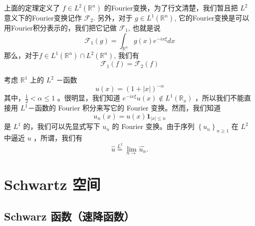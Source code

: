 \begin{remark}
上面的定理定义了 $f \in L^2(\mathbb{R}^n)$ 的Fourier变换，为了行文清楚，我们暂且把 $L^2$ 意义下的Fourier变换记作 $\mathcal{F}_2$. 另外，对于 $g \in L^1(\mathbb{R}^n)$, 它的Fourier变换是可以用Fourier积分表示的，我们把它记做 $\mathcal{F}_1$, 也就是说
\[
\mathcal{F}_1(g)=\int_{\mathbb{R}^n} g(x) e^{-i x \xi} d x
\]那么，对于$f \in L^1(\mathbb{R}^n) \cap L^2(\mathbb{R}^n)$, 我们有
\[
\mathcal{F}_1(f)=\mathcal{F}_2(f)
\]
\end{remark}
\begin{example}
考虑 $\mathbb{R}^1$ 上的 $L^2$ －函数
\[
u(x)=(1+|x|)^{-\alpha}
\]其中，$\frac{1}{2}<\alpha \leqslant 1$ 。很明显，我们知道 $e^{-i x \xi} u(x) \notin L^1\left(\mathbb{R}_x\right)$ ，所以我们不能直接用 $L^1$－函数的 Fourier 积分来写它的 Fourier 变换。然而，我们知道
\[
u_n(x)=u(x) \mathbf{1}_{|x| \leqslant n}
\]是 $L^1$ 的，我们可以先显式写下 $u_n$ 的 Fourier 变换。由于序列 $\left\{u_n\right\}_{n \geqslant 1}$ 在 $L^2$ 中逼近 $u$ ，所谓，我们有
\[
\widehat{u} \stackrel{L^2}{=} \lim _{n \rightarrow} \widehat{u_n} .
\]
\end{example}
\section{Schwartz 空间}

\subsection{Schwarz 函数（速降函数）}

